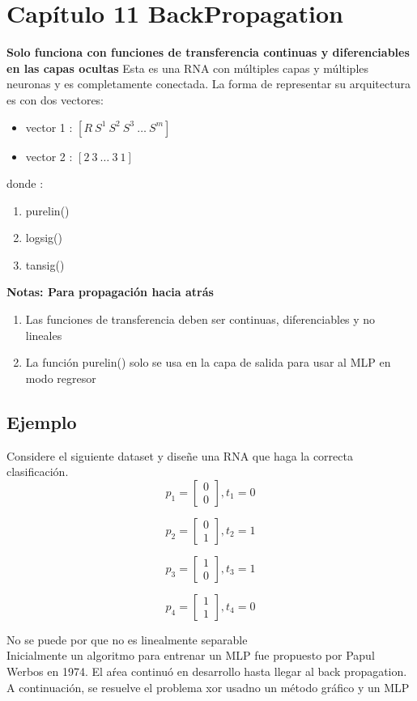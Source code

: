 \documentclass{article}
\begin{document}
\section{Capítulo 11 BackPropagation}
\textbf{Solo funciona con funciones de transferencia continuas y diferenciables en las capas ocultas}
Esta es una RNA con múltiples capas y múltiples neuronas y es completamente conectada.
La forma de representar su arquitectura es con dos vectores:
\begin{itemize}
	\item vector 1 : $ [R\ S^1\ S^2\ S^3\ \dots\ S^m] $
	\item vector 2 : $ [2 \ 3\ \dots\ 3\ 1] $
\end{itemize}
donde :
\begin{enumerate}
	\item purelin()
	\item logsig()
	\item tansig()
\end{enumerate}
\textbf{Notas: Para propagación hacia atrás}
\begin{enumerate}
	\item Las funciones de transferencia deben ser continuas, diferenciables y no lineales
	\item La función purelin() solo se usa en la capa de salida para usar al MLP en modo regresor
\end{enumerate}
\subsection{Ejemplo}
Considere el siguiente dataset y diseñe una RNA que haga la correcta clasificación.
\[p_1= 
\begin{bmatrix}
0\\
0
\end{bmatrix}, t_1=0
\]

\[p_2= 
\begin{bmatrix}
0\\
1
\end{bmatrix}, t_2=1
\]

\[p_3= 
\begin{bmatrix}
1\\
0
\end{bmatrix}, t_3=1
\]

\[p_4= 
\begin{bmatrix}
1\\
1
\end{bmatrix}, t_4=0
\]

No se puede por que no es linealmente separable\\
Inicialmente un algoritmo para entrenar un MLP fue propuesto por Papul Werbos en 1974. El aŕea continuó en desarrollo hasta llegar al back propagation. A continuación, se resuelve el problema xor usadno un método gráfico y un MLP
\end{document}
